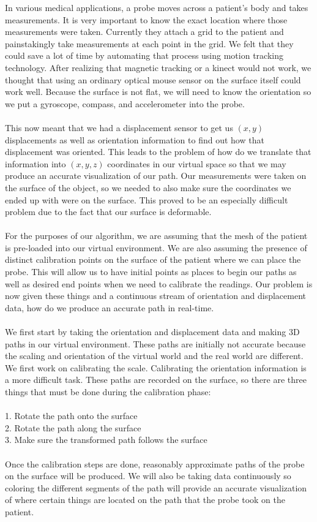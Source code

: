 \documentclass[conference]{acmsiggraph}
\begin{document}
In various medical applications, a probe moves across a patient's body and takes measurements. It is very important to know the exact location where those measurements were taken. Currently they attach a grid to the patient and painstakingly take measurements at each point in the grid. We felt that they could save a lot of time by automating that process using motion tracking technology. After realizing that magnetic tracking or a kinect would not work, we thought that using an ordinary optical mouse sensor on the surface itself could work well. Because the surface is not flat, we will need to know the orientation so we put a gyroscope, compass, and accelerometer into the probe. \\
\\
This now meant that we had a displacement sensor to get us $(x,y)$ displacements as well as orientation information to find out how that displacement was oriented. This leads to the problem of how do we translate that information into $(x,y,z)$ coordinates in our virtual space so that we may produce an accurate visualization of our path. Our measurements were taken on the surface of the object, so we needed to also make sure the coordinates we ended up with were on the surface. This proved to be an especially difficult problem due to the fact that our surface is deformable. \\
\\
For the purposes of our algorithm, we are assuming that the mesh of the patient is pre-loaded into our virtual environment. We are also assuming the presence of distinct calibration points on the surface of the patient where we can place the probe. This will allow us to have initial points as places to begin our paths as well as desired end points when we need to calibrate the readings. Our problem is now given these things and a continuous stream of orientation and displacement data, how do we produce an accurate path in real-time.\\
\\
We first start by taking the orientation and displacement data and making 3D paths in our virtual environment. These paths are initially not accurate because the scaling and orientation of the virtual world and the real world are different. We first work on calibrating the scale. Calibrating the orientation information is a more difficult task. These paths are recorded on the surface, so there are three things that must be done during the calibration phase: \\
\\
1. Rotate the path onto the surface\\
2. Rotate the path along the surface\\
3. Make sure the transformed path follows the surface\\
\\
Once the calibration steps are done, reasonably approximate paths of the probe on the surface will be produced. We will also be taking data continuously so coloring the different segments of the path will provide an accurate visualization of where certain things are located on the path that the probe took on the patient.
\end{document}
